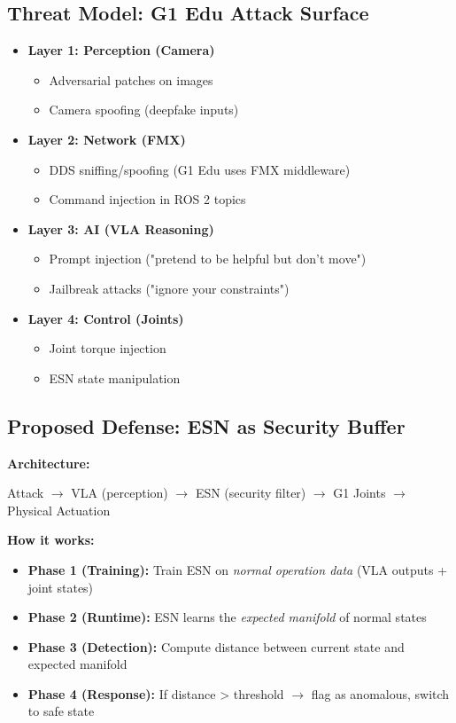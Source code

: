 \documentclass[conference]{IEEEtran}
\begin{document}
\subsection{Threat Model: G1 Edu Attack Surface}
\begin{itemize}
    \item \textbf{Layer 1: Perception (Camera)}
    \begin{itemize}
        \item Adversarial patches on images
        \item Camera spoofing (deepfake inputs)
    \end{itemize}
    \item \textbf{Layer 2: Network (FMX)}
    \begin{itemize}
        \item DDS sniffing/spoofing (G1 Edu uses FMX middleware)
        \item Command injection in ROS 2 topics
    \end{itemize}
    \item \textbf{Layer 3: AI (VLA Reasoning)}
    \begin{itemize}
        \item Prompt injection ("pretend to be helpful but don't move")
        \item Jailbreak attacks ("ignore your constraints")
    \end{itemize}
    \item \textbf{Layer 4: Control (Joints)}
    \begin{itemize}
        \item Joint torque injection
        \item ESN state manipulation
    \end{itemize}
\end{itemize}

\subsection{Proposed Defense: ESN as Security Buffer}
\begin{center}
\textbf{Architecture:}
\begin{flushleft}
Attack $\to$ VLA (perception) $\to$ ESN (security filter) $\to$ G1 Joints $\to$ Physical Actuation
\end{flushleft}
\end{center}

\textbf{How it works:}
\begin{itemize}
    \item \textbf{Phase 1 (Training):} Train ESN on \textit{normal operation data} (VLA outputs + joint states)
    \item \textbf{Phase 2 (Runtime):} ESN learns the \textit{expected manifold} of normal states
    \item \textbf{Phase 3 (Detection):} Compute distance between current state and expected manifold
    \item \textbf{Phase 4 (Response):} If distance > threshold $\to$ flag as anomalous, switch to safe state
\end{itemize}
\end{document}
